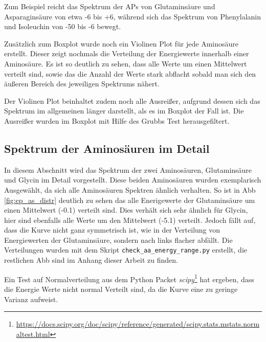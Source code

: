 Zum Beispiel reicht das Spektrum der \ac{APs} von Glutaminsäure und Asparaginsäure von etwa -6 bis +6, während sich das Spektrum von Phenylalanin und Isoleuchin von -50 bis -6 bewegt. 

Zusätzlich zum Boxplot wurde noch ein Violinen Plot für jede Aminosäure erstellt. Dieser zeigt nochmals die Verteilung der Energiewerte innerhalb einer Aminosäure. Es ist so deutlich zu sehen, dass alle Werte um einen Mittelwert verteilt sind, sowie das die Anzahl der Werte stark abflacht sobald man sich den äußeren Bereich des jeweiligen Spektrums nähert.

Der Violinen Plot beinhaltet zudem noch alle Ausreißer, aufgrund dessen sich das Spektrum im allgemeinen länger darstellt, als es im Boxplot der Fall ist. Die Ausreißer wurden im Boxplot mit Hilfe des Grubbs Test\cite{Jain.2010} herausgefiltert. 


\subsection{Spektrum der Aminosäuren im Detail}
In diesem Abschnitt wird das Spektrum der zwei Aminosäuren, Glutaminsäure und Glycin im Detail vorgestellt. Diese beiden Aminosäuren wurden exemplarisch Ausgewählt, da sich alle Aminosäuren Spektren ähnlich verhalten. So ist in \ac{Abb} \ref{fig:ep_as_distr} deutlich zu sehen das alle Enerigewerte der Glutaminsäure um einen Mittelwert (-0.1) verteilt sind. Dies verhält sich sehr ähnlich für Glycin, hier sind ebenfalls alle Werte um den Mittelwert (-5.1) verteilt. Jedoch fällt auf, dass die Kurve nicht ganz symmetrisch ist, wie in der Verteilung von Energiewerten der Glutaminsäure, sondern nach links flacher abfällt. Die Verteilungen wurden mit dem Skript \texttt{check\_aa\_energy\_range.py} erstellt, die restlichen \ac{Abb} sind im Anhang dieser Arbeit zu finden. 

Ein Test auf Normalverteilung aus dem Python Packet \emph{scipy}\footnote{\url{https://docs.scipy.org/doc/scipy/reference/generated/scipy.stats.mstats.normaltest.html}} hat ergeben, dass die Energie Werte nicht normal Verteilt sind, da die Kurve eine zu geringe Varianz aufweist. 

